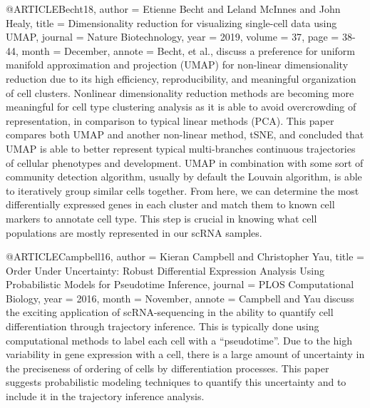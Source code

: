   @ARTICLE{Becht18,
  author    = {Etienne Becht and Leland McInnes and John Healy},
  title     = {Dimensionality reduction for visualizing single-cell data using UMAP},
  journal   = {Nature Biotechnology},
  year      = {2019},
  volume    = {37},
  page    = {38-44},
  month     = {December},
  annote    = {Becht, et al., discuss a preference for uniform manifold approximation and projection (UMAP) for non-linear dimensionality reduction due to its high efficiency, reproducibility, and meaningful organization of cell clusters. Nonlinear dimensionality reduction methods are becoming more meaningful for cell type clustering analysis as it is able to avoid overcrowding of representation, in comparison to typical linear methods (PCA). This paper compares both UMAP and another non-linear method, tSNE, and concluded that UMAP is able to better represent typical multi-branches continuous trajectories of cellular phenotypes and development. UMAP in combination with some sort of community detection algorithm, usually by default the Louvain algorithm, is able to iteratively group similar cells together. From here, we can determine the most differentially expressed genes in each cluster and match them to known cell markers to annotate cell type. This step is crucial in knowing what cell populations are mostly represented in our scRNA samples.
}
}

 @ARTICLE{Campbell16,
  author    = {Kieran Campbell and Christopher Yau},
  title     = {Order Under Uncertainty: Robust Differential Expression Analysis Using Probabilistic Models for Pseudotime Inference},
  journal   = {PLOS Computational Biology},
  year      = {2016},
  month     = {November},
  annote    = {Campbell and Yau discuss the exciting application of scRNA-sequencing in the ability to quantify cell differentiation through trajectory inference. This is typically done using computational methods to label each cell with a “pseudotime”. Due to the high variability in gene expression with a cell, there is a large amount of uncertainty in the preciseness of ordering of cells by differentiation processes. This paper suggests probabilistic modeling techniques to quantify this uncertainty and to include it in the trajectory inference analysis.
}
}

